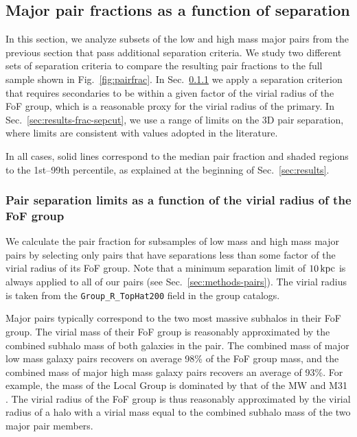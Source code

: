 \documentclass[twocolumn]{aastex631}
\begin{document}
\subsection{Major pair fractions as a function of separation}\label{sec:results-frac-cuts}
    In this section, we analyze subsets of the low and high mass major pairs from the previous section that pass additional separation criteria. 
    We study two different sets of separation criteria to compare the resulting pair fractions to the full sample shown in Fig.~\ref{fig:pairfrac}.
    In  Sec.~\ref{sec:results-frac-vircut} we apply a separation criterion that requires secondaries to be within a given factor of the virial radius of the FoF group, which is a reasonable proxy for the virial radius of the primary. 
    In Sec.~\ref{sec:results-frac-sepcut}, we use a range of limits on the 3D pair separation, where limits are consistent with values adopted in the literature. 
    
    In all cases, solid lines correspond to the median pair fraction and shaded regions to the 1st--99th percentile, as explained at the beginning of Sec.~\ref{sec:results}. 

\subsubsection{Pair separation limits as a function of the virial radius of the FoF group}\label{sec:results-frac-vircut}
    We calculate the pair fraction for subsamples of low mass and high mass major pairs by selecting only pairs that have separations less than some factor of the virial radius of its FoF group. 
    Note that a minimum separation limit of $10\mathrm{\,kpc}$ is always applied to all of our pairs (see Sec.~\ref{sec:methods-pairs}). 
    The virial radius is taken from the \texttt{Group\_R\_TopHat200} field in the group catalogs. 
   
    Major pairs typically correspond to the two most massive subhalos in their FoF group. 
    The virial mass of their FoF group is reasonably approximated by the combined subhalo mass of both galaxies in the pair.
    The combined mass of major low mass galaxy pairs recovers on average 98\% of the FoF group mass, and the combined mass of major high mass galaxy pairs recovers an average of 93\%. 
    For example, the mass of the Local Group is dominated by that of the MW and M31 \citep[e.g., ][]{Chamberlain2023}. 
    The virial radius of the FoF group is thus reasonably approximated by the virial radius of a halo with a virial mass equal to the combined subhalo mass of the two major pair members. %
    
\end{document}
